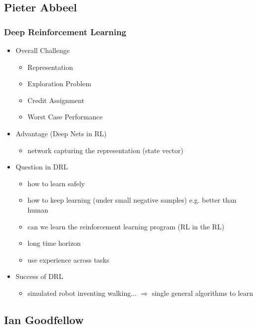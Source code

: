 \subsection{Pieter Abbeel}
\subsubsection{Deep Reinforcement Learning}
\begin{itemize}
\item Overall Challenge 
	\begin{itemize}
	\item Representation
	\item Exploration Problem
	\item Credit Assignment
	\item Worst Case Performance
	\end{itemize}
\item Advantage (Deep Nets in RL)
	\begin{itemize}
	\item network capturing the representation (state vector)
	\end{itemize}
\item Question in DRL
	\begin{itemize}
	\item how to learn safely
	\item how to keep learning (under small negative samples) e.g. better than human
	\item can we learn the reinforcement learning program (RL in the RL)
	\item long time horizon
	\item use experience across tasks
	\end{itemize}
\item Success of DRL
	\begin{itemize}
	\item simulated robot inventing walking... $\Rightarrow$ single general algorithms to learn
	\end{itemize}
\end{itemize}

\subsection{Ian Goodfellow}
